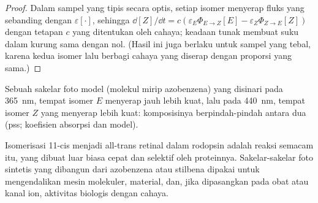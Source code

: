 \begin{proof}
Dalam sampel yang tipis secara optis, setiap isomer menyerap fluks yang
sebanding dengan $\varepsilon[\cdot]$, sehingga
$\dd[Z]/\dd t = c(\varepsilon_E\Phi_{E\to Z}[E] - \varepsilon_Z\Phi_{Z\to E}[Z])$ dengan tetapan $c$ yang
ditentukan oleh cahaya; keadaan tunak membuat suku dalam kurung sama dengan
nol. (Hasil ini juga berlaku untuk sampel yang tebal, karena kedua isomer lalu
berbagi cahaya yang diserap dengan proporsi yang sama.)
\end{proof}

\begin{omfigure}

{\small Sebuah sakelar foto model (molekul mirip azobenzena) yang disinari pada
\qty{365}{nm}, tempat isomer $E$ menyerap jauh lebih kuat, lalu pada
\qty{440}{nm}, tempat isomer $Z$ yang menyerap lebih kuat: komposisinya
berpindah-pindah antara dua  (pss; koefisien absorpsi dan
 model).}
\end{omfigure}

Isomerisasi 11-cis menjadi all-trans retinal dalam rodopsin adalah reaksi
semacam itu, yang dibuat luar biasa cepat dan selektif oleh proteinnya.
Sakelar-sakelar foto sintetis yang dibangun dari azobenzena atau stilbena
dipakai untuk mengendalikan mesin molekuler, material, dan, jika dipasangkan
pada obat atau kanal ion, aktivitas biologis dengan cahaya.

